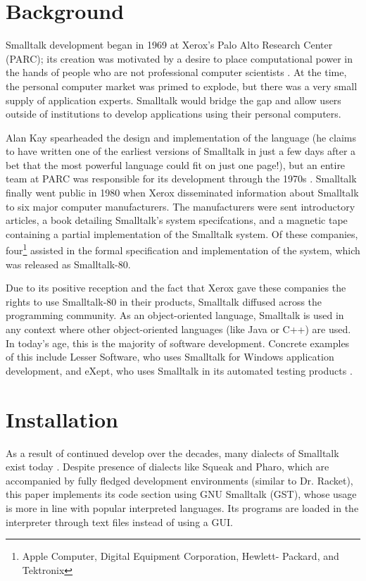 \section{Background}

Smalltalk development began in 1969 at Xerox's Palo Alto Research Center (PARC); its creation was motivated by a desire to place computational power in the hands of people who are not professional computer scientists \cite{bitsandpieces}. At the time, the personal computer market was primed to explode, but there was a very small supply of application experts. Smalltalk would bridge the gap and allow users outside of institutions to develop applications using their personal computers. 

Alan Kay spearheaded the design and implementation of the language (he claims to have written one of the earliest versions of Smalltalk in just a few days after a bet that the most powerful language could fit on just one page!), but an entire team at PARC was responsible for its development through the 1970s \cite{alankay}. Smalltalk finally went public in 1980 when Xerox disseminated information about Smalltalk to six major computer manufacturers. The manufacturers were sent introductory articles, a book detailing Smalltalk's system specifcations, and a magnetic tape containing a partial implementation of the Smalltalk system. Of these companies, four\footnote{Apple Computer, Digital Equipment Corporation, Hewlett- Packard, and Tektronix} assisted in the formal specification and implementation of the system, which was released as Smalltalk-80.

Due to its positive reception and the fact that Xerox gave these companies the rights to use Smalltalk-80 in their products, Smalltalk diffused across the programming community. As an object-oriented language, Smalltalk is used in any context where other object-oriented languages  (like Java or C++) are used. In today's age, this is the majority of software development. Concrete examples of this include Lesser Software, who uses Smalltalk for Windows application development, and eXept, who uses Smalltalk in its automated testing products \cite{exept} \cite{lesser}.

\section{Installation}

As a result of continued develop over the decades, many dialects of Smalltalk exist today \cite{something}. Despite presence of dialects like Squeak and Pharo, which are accompanied by fully fledged development environments (similar to Dr. Racket), this paper implements its code section using GNU Smalltalk (GST), whose usage is more in line with popular interpreted languages. Its programs are loaded in the interpreter through text files instead of using a GUI.

